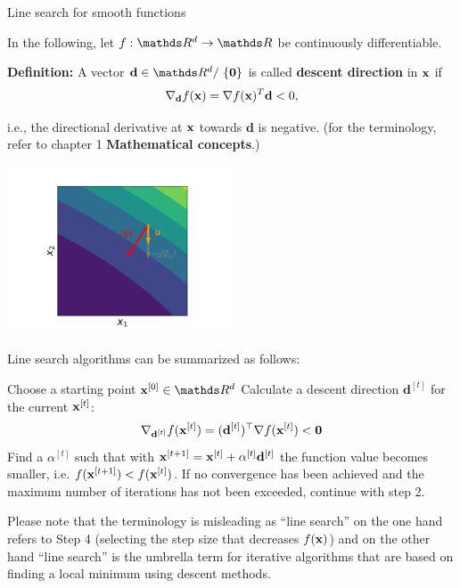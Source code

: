 \documentclass[11pt,compress,t,notes=noshow, xcolor=table]{beamer}
\begin{document}
\begin{vbframe}{Line search for smooth functions}

	In the following, let $f: \R^d \to \R$ be continuously differentiable.
	
	\lz
	
	\textbf{Definition:} A vector $\mathbf{d}\in \R^d /\ \{\mathbf{0}\}$ is called \textbf{descent direction} in $\mathbf{x}$ if
	$$
	\nabla_{\mathbf{d}} f(\mathbf{x}) = \nabla f(\mathbf{x}) ^T \mathbf{d} < 0,
	$$
	
	i.e., the directional derivative at $\mathbf{x}$ towards $\mathbf{d}$ is negative.
	(for the terminology, refer to chapter 1 \textbf{Mathematical concepts}.)
	\vspace*{-0.2cm}
	\begin{center}
		\includegraphics[width = 0.5\textwidth]{figure_man/descent_direction.png}
	\end{center}
	
	\framebreak
	
	Line search algorithms can be summarized as follows:
	\vspace*{-0.2cm}
	\begin{algorithm}[H]
	  \caption{Line search}
	  \begin{algorithmic}[1]
	  \State Choose a starting point $\xv^{[0]} \in \R^d$
	    \State Calculate a descent direction $\mathbf{d}^{[t]}$ for the current $\mathbf{x}^{[t]}$:
	$$
	\nabla_{\mathbf{d}^{[t]}} f(\mathbf{x}^{[t]}) = (\mathbf{d}^{[t]})^\top\nabla f(\mathbf{x}^{[t]}) < \mathbf{0}
	$$
	    \State Find a $\alpha^{[t]}$ such that with $\mathbf{x}^{[t + 1]} = \mathbf{x}^{[t]} + \alpha^{[t]} \mathbf{d}^{[t]}$
	  the function value becomes smaller, i.e. $f(\mathbf{x}^{[t + 1]}) < f(\mathbf{x}^{[t]})$.
	    \State If no convergence has been achieved and the maximum number of iterations
	has not been exceeded, continue with step 2.
	  \EndFor
	  \end{algorithmic}
	\end{algorithm}
	\vspace*{-0.2cm}
	\begin{tiny}
		Please note that the terminology is misleading as ``line search'' on the one hand refers to Step 4 (selecting the step size that decreases $f(\mathbf{x})$) and on the other hand ``line search'' is the umbrella term for iterative algorithms that are based on finding a local minimum using descent methods. \par
	\end{tiny}
\end{vbframe}
\end{document}
